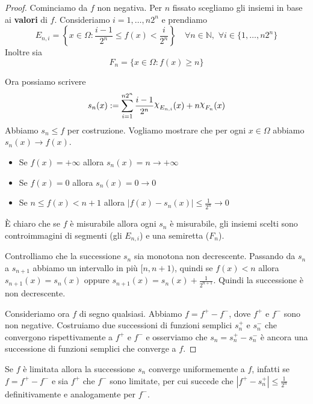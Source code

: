 \begin{proof}
    Cominciamo da \(f\) non negativa. Per \(n\) fissato scegliamo gli insiemi in
    base ai \textbf{valori} di \(f\). Consideriamo \(i = 1, \dots, n2^{n}\) e
    prendiamo \[E_{n, i} = \left\{x \in \Omega : \frac{i-1}{2^{n}} \le f(x) <
    \frac{i}{2^{n}}\right\} \quad \forall n \in \mathbb{N}, \,\, \forall i \in \{1,
\dots, n2^{n}\}  \] 
Inoltre sia \[ F_{n}=\{x \in \Omega : f(x) \ge n\} \]

    Ora possiamo scrivere
    \[
        s_{n}(x) := \sum_{i=1}^{n{2}^{n}} \frac{i-1}{2^{n}} \rchi_{E_{n, i}}(x) +
        n \rchi_{F_{n}}(x)
    \]
    Abbiamo \(s_{n} \le f\) per costruzione. Vogliamo
    mostrare che per ogni \(x \in \Omega\) abbiamo \(s_{n}(x) \to f(x)\).
\begin{itemize}[label = --]
    \item Se \(f(x) = +\infty\) allora \(s_{n}(x) = n \to +\infty\)
    \item Se \(f(x) = 0\) allora \(s_{n}(x) = 0 \to 0\)
    \item Se \(n \le f(x) < n+1\) allora \(|f(x) - s_{n}(x)| \le \frac{1}{2^{n}}
        \to 0\) 
\end{itemize}

È chiaro che se \(f\) è misurabile allora ogni \(s_{n}\) è misurabile, gli
insiemi scelti sono controimmagini di segmenti (gli \(E_{n,i}\)) e una semiretta
(\(F_n\)).

Controlliamo che la successione \(s_{n}\) sia monotona non decrescente. Passando
da \(s_{n}\) a \(s_{n+1}\) abbiamo un intervallo in più \([n, n+1)\), quindi se
\(f(x) < n\) allora \(s_{n+1}(x) = s_{n}(x)\) oppure \(s_{n+1}(x) = s_{n}(x) +
\frac{1}{2^{n+1}}\). Quindi la successione è non decrescente.

Consideriamo ora \(f\) di segno qualsiasi. Abbiamo \(f = f^{+} - f^{-}\), dove
\(f^{+}\) e \(f^{-}\) sono non negative. Costruiamo due successioni di funzioni
semplici \(s_{n}^{+}\) e \(s_{n}^{-}\) che convergono rispettivamente a
\(f^{+}\) e \(f^{-}\) e osserviamo che \(s_{n} = s_{n}^{+} -
s_{n}^{-}\) è ancora una successione di funzioni semplici che converge a \(f\).
\end{proof}
\begin{remark}
    Se \(f\) è limitata allora la successione \(s_{n}\) converge uniformemente a
    \(f\), infatti se \(f = f^{+} - f^{-}\) e sia \(f^{+}\) che \(f^{-}\) sono
    limitate, per cui succede che \(|f^{+} - s_{n}^{+}| \le \frac{1}{2^{n}}\)
    definitivamente e analogamente per \(f^{-}\).
\end{remark}

